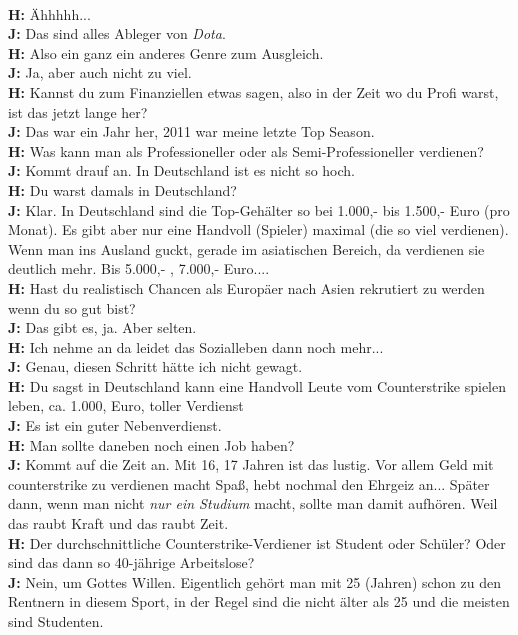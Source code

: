 \\ \textbf{H:} Ähhhhh...
\\ \textbf{J:} Das sind alles Ableger von \textit{Dota}.
\\ \textbf{H:} Also ein ganz ein anderes Genre zum Ausgleich.
\\ \textbf{J:} Ja, aber auch nicht zu viel.
\\ \textbf{H:} Kannst du zum Finanziellen etwas sagen, also in der Zeit wo du Profi warst, ist das jetzt lange her?
\\ \textbf{J:} Das war ein Jahr her, 2011 war meine letzte Top Season.
\\ \textbf{H:} Was kann man als Professioneller oder als Semi-Professioneller verdienen?
\\ \textbf{J:} Kommt drauf an. In Deutschland ist es nicht so hoch.
\\ \textbf{H:} Du warst damals in Deutschland?
\\ \textbf{J:} Klar. In Deutschland sind die Top-Gehälter so bei 1.000,- bis 1.500,- Euro (pro Monat). Es gibt aber nur eine Handvoll (Spieler) maximal (die so viel verdienen). Wenn man ins Ausland guckt, gerade im asiatischen Bereich, da verdienen sie deutlich mehr. Bis 5.000,- , 7.000,- Euro....
\\ \textbf{H:} Hast du realistisch Chancen als Europäer nach Asien rekrutiert zu werden wenn du so gut bist?
\\ \textbf{J:} Das gibt es, ja. Aber selten.
\\ \textbf{H:} Ich nehme an da leidet das Sozialleben dann noch mehr...
\\ \textbf{J:} Genau, diesen Schritt hätte ich nicht gewagt.
\\ \textbf{H:} Du sagst in Deutschland kann eine Handvoll Leute vom Counterstrike spielen leben, ca. 1.000, Euro, toller Verdienst
\\ \textbf{J:} Es ist ein guter Nebenverdienst.
\\ \textbf{H:} Man sollte daneben noch einen Job haben?
\\ \textbf{J:} Kommt auf die Zeit an. Mit 16, 17 Jahren ist das lustig. Vor allem Geld mit counterstrike zu verdienen macht Spaß, hebt nochmal den Ehrgeiz an... Später dann, wenn man nicht \textit{nur ein Studium} macht, sollte man damit aufhören. Weil das raubt Kraft und das raubt Zeit.
\\ \textbf{H:} Der durchschnittliche Counterstrike-Verdiener ist  Student oder Schüler? Oder sind das dann so 40-jährige Arbeitslose?
\\ \textbf{J:} Nein, um Gottes Willen. Eigentlich gehört man mit 25 (Jahren) schon zu den Rentnern in diesem Sport, in der Regel sind die nicht älter als 25 und die meisten sind Studenten.
